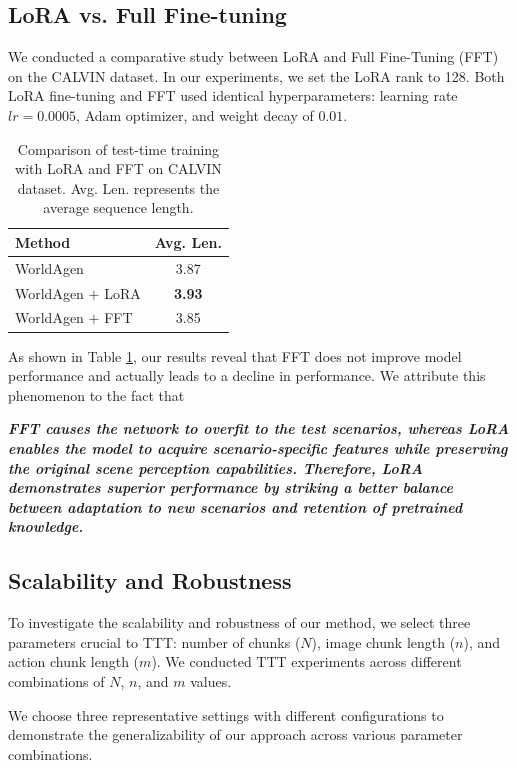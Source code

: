 \subsection{LoRA vs. Full Fine-tuning} 

We conducted a comparative study between LoRA and Full Fine-Tuning (FFT) on the CALVIN dataset. In our experiments, we set the LoRA rank to 128. Both LoRA fine-tuning and FFT used identical hyperparameters: learning rate $lr = 0.0005$, Adam optimizer, and weight decay of $0.01$.

\begin{table}[h]
\centering
\begin{tabular}{lc}
\hline
Method & Avg. Len. \\
\hline
WorldAgen & 3.87 \\
WorldAgen $+$ LoRA & \textbf{3.93} \\
WorldAgen $+$ FFT & 3.85 \\
\hline
\end{tabular}
\caption{Comparison of test-time training with LoRA and FFT on CALVIN dataset. Avg. Len. represents the average sequence length.}
\label{tab:lora_vs_fft}
\end{table}

As shown in Table \ref{tab:lora_vs_fft}, our results reveal that FFT does not improve model performance and actually leads to a decline in performance. We attribute this phenomenon to the fact that

\textbf{\textit{FFT causes the network to overfit to the test scenarios, whereas LoRA enables the model to acquire scenario-specific features while preserving the original scene perception capabilities. Therefore, LoRA demonstrates superior performance by striking a better balance between adaptation to new scenarios and retention of pretrained knowledge.}}

\subsection{Scalability and Robustness} To investigate the scalability and robustness of our method, we select three parameters crucial to TTT: number of chunks ($N$), image chunk length ($n$), and action chunk length ($m$). We conducted TTT experiments across different combinations of $N$, $n$, and $m$ values.

We choose three representative settings with different configurations to demonstrate the generalizability of our approach across various parameter combinations.

